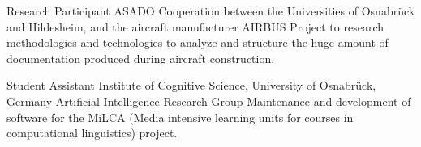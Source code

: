         {Research Participant}
        {ASADO}
        {Cooperation between the Universities of Osnabr\"{u}ck and Hildesheim,
        and the aircraft manufacturer AIRBUS}
        {}
        {Project to research methodologies and
        technologies to analyze and structure the huge amount of documentation
        produced during aircraft construction.}

        {Student Assistant}
        {Institute of Cognitive Science, University of Osnabr\"{u}ck, Germany}
        {Artificial Intelligence Research Group}
        {}
        {Maintenance and development of software for the MiLCA (Media intensive
        learning units for courses in computational linguistics) project.}




